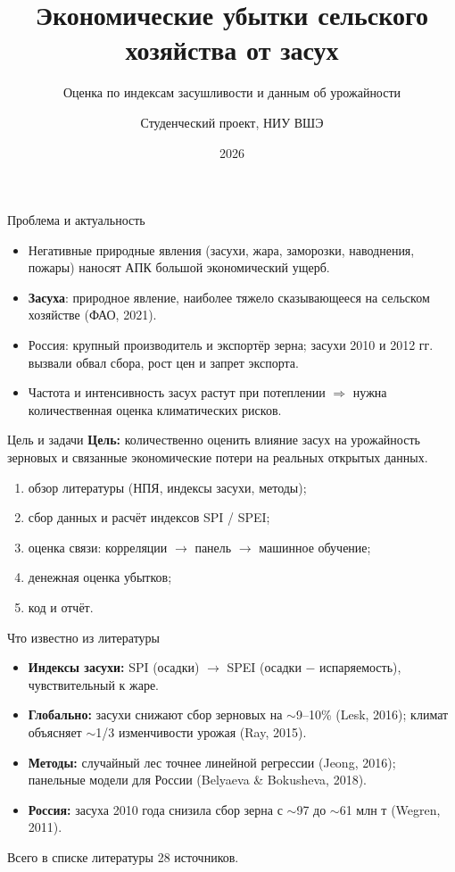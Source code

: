 \documentclass[aspectratio=169,11pt]{beamer}
\title[Засухи и убытки АПК]{Экономические убытки сельского хозяйства от засух}
\subtitle{Оценка по индексам засушливости и данным об урожайности}
\author{Студенческий проект, НИУ ВШЭ}
\date{2026}
\begin{document}
\begin{frame}[plain]\titlepage\end{frame}

\begin{frame}{Проблема и актуальность}
\begin{itemize}
  \item Негативные природные явления (засухи, жара, заморозки, наводнения, пожары) наносят АПК большой экономический ущерб.
  \item \textbf{Засуха}: природное явление, наиболее тяжело сказывающееся на сельском хозяйстве (ФАО, 2021).
  \item Россия: крупный производитель и экспортёр зерна; засухи 2010 и 2012 гг. вызвали обвал сбора, рост цен и запрет экспорта.
  \item Частота и интенсивность засух растут при потеплении $\Rightarrow$ нужна количественная оценка климатических рисков.
\end{itemize}
\end{frame}

\begin{frame}{Цель и задачи}
\textbf{Цель:} количественно оценить влияние засух на урожайность зерновых и связанные экономические потери на реальных открытых данных.
\medskip
\begin{enumerate}
  \item обзор литературы (НПЯ, индексы засухи, методы);
  \item сбор данных и расчёт индексов SPI / SPEI;
  \item оценка связи: корреляции $\to$ панель $\to$ машинное обучение;
  \item денежная оценка убытков;
  \item код и отчёт.
\end{enumerate}
\end{frame}

\begin{frame}{Что известно из литературы}
\begin{itemize}
  \item \textbf{Индексы засухи:} SPI (осадки) $\to$ SPEI (осадки $-$ испаряемость), чувствительный к жаре.
  \item \textbf{Глобально:} засухи снижают сбор зерновых на $\sim$9--10\% (Lesk, 2016); климат объясняет $\sim$1/3 изменчивости урожая (Ray, 2015).
  \item \textbf{Методы:} случайный лес точнее линейной регрессии (Jeong, 2016); панельные модели для России (Belyaeva \& Bokusheva, 2018).
  \item \textbf{Россия:} засуха 2010 года снизила сбор зерна с $\sim$97 до $\sim$61 млн т (Wegren, 2011).
\end{itemize}
\centerline{\footnotesize Всего в списке литературы 28 источников.}
\end{frame}
\end{document}
